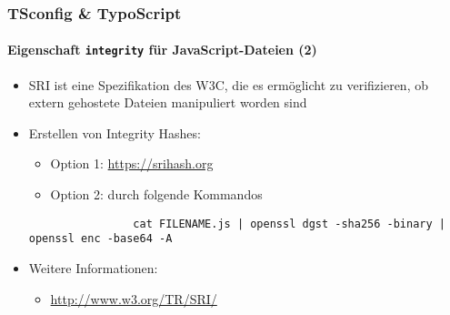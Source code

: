 \begin{frame}[fragile]
	\frametitle{TSconfig \& TypoScript}
	\framesubtitle{Eigenschaft \texttt{integrity} für JavaScript-Dateien (2)}


	\begin{itemize}

		\item SRI ist eine Spezifikation des W3C, die es ermöglicht zu verifizieren,
			ob extern gehostete Dateien manipuliert worden sind

		\item Erstellen von Integrity Hashes:

			\begin{itemize}
				\item Option 1: \url{https://srihash.org}
				\item Option 2: durch folgende Kommandos
			\end{itemize}

			\begin{lstlisting}
				cat FILENAME.js | openssl dgst -sha256 -binary | openssl enc -base64 -A
			\end{lstlisting}

		\item Weitere Informationen:

			\begin{itemize}
				\item \url{http://www.w3.org/TR/SRI/}
			\end{itemize}

	\end{itemize}

\end{frame}

